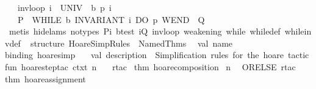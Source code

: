 \begin{isabellebody}
\ \ \ inv{}loop{}\ {}i\ {}\ {}UNIV\ {}\ b{}\ {}p{}\ i{}\isanewline
\ \ \ {}P\ {}\ WHILE\ b\ INVARIANT\ i\ DO\ p\ WEND\ {}\ Q{}\isanewline
%
\isadelimproof
\ \ %
\endisadelimproof
%
\isatagproof
{}\isamarkupfalse%
\ {}metis\ {}hide{}lams{}\ no{}types{}\ Pi\ b{}test\ iQ\ inv{}loop\ weakening\ while\ while{}def\ while{}inv{}def{}%
\endisatagproof
{\isafoldproof}%
%
\isadelimproof
\isanewline
%
\endisadelimproof
\isanewline
%
\isadelimML
\isanewline
%
\endisadelimML
%
\isatagML
{}\isamarkupfalse%
\ {}\isanewline
\isanewline
structure\ HoareSimpRules\ {}\ Named{}Thms\isanewline
\ \ {}val\ name\ {}\ %
\isaantiq
binding\ {}hoare{}simp{}{}%
\endisaantiq
\isanewline
\ \ \ val\ description\ {}\ {}Simplification\ rules\ for\ the\ hoare\ tactic{}{}\isanewline
\isanewline
fun\ hoare{}step{}tac\ ctxt\ n\ {}\isanewline
\ \ rtac\ %
\isaantiq
thm\ hoare{}composition{}%
\endisaantiq
\ n\isanewline
\ \ ORELSE\ {}rtac\ %
\isaantiq
thm\ hoare{}assignment{}%

\end{isabellebody}
